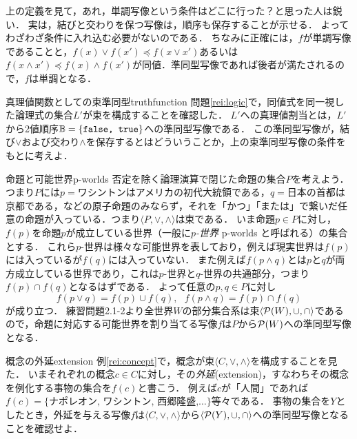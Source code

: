 \documentclass[11pt,a4paper, dvipdfmx]{jsarticle}
\begin{document}
\begin{attn}
上の定義を見て，あれ，単調写像という条件はどこに行った？と思った人は鋭い．
実は，結びと交わりを保つ写像は，順序も保存することが示せる．
よってわざわざ条件に入れ込む必要がないのである．
ちなみに正確には，$f$が単調写像であることと，$f(x) \vee f(x') \preceq f (x \vee x')$あるいは$f(x \wedge x') \preceq f(x) \wedge f(x')$が同値．準同型写像であれば後者が満たされるので，$f$は単調となる．
\end{attn}

\begin{rei}{真理値関数としての束準同型}{truthfunction}
問題\ref{rei:logic}で，同値式を同一視した論理式の集合$L'$が束を構成することを確認した．
$L'$への真理値割当とは，$L'$から2値順序$\mathbb{B} = \{ \texttt{false, true} \}$への準同型写像である．
この準同型写像が，結び$\vee$および交わり$\wedge$を保存するとはどういうことか，上の束準同型写像の条件をもとに考えよ．
\end{rei}

\begin{rei}{命題と可能世界}{p-worlds}
否定を除く論理演算で閉じた命題の集合$P$を考えよう．
つまり$P$には$p=$ワシントンはアメリカの初代大統領である，$q=$日本の首都は京都である，などの原子命題のみならず，それを「かつ」「または」で繋いだ任意の命題が入っている．つまり$\langle P, \vee, \wedge \rangle$は束である．
いま命題$p \in P$に対し，$f(p)$を命題$p$が成立している世界（一般に\emph{$p$-世界} p-worlds と呼ばれる）の集合とする．
これら$p$-世界は様々な可能世界を表しており，例えば現実世界は$f(p)$には入っているが$f(q)$には入っていない．
また例えば$f(p \wedge q)$とは$p$と$q$が両方成立している世界であり，これは$p$-世界と$q$-世界の共通部分，つまり$f(p) \cap f(q)$となるはずである．
よって任意の$p, q \in P$に対し
\[ f(p \vee q) = f(p) \cup f(q), \ \ \ f(p \wedge q) = f(p) \cap f(q) \]
が成り立つ．
練習問題2.1-2より全世界$W$の部分集合系は束$\langle \mathcal{P}(W), \cup, \cap \rangle$であるので，命題に対応する可能世界を割り当てる写像$f$は$P$から$\mathcal{P}(W)$への準同型写像となる．
\end{rei}

\begin{rei}{概念の外延}{extension}
例\ref{rei:concept}で，概念が束$\langle C, \vee, \wedge \rangle$を構成することを見た．
いまそれぞれの概念$c \in C$に対し，その\emph{外延}(extension)，すなわちその概念を例化する事物の集合を$f(c)$と書こう．
例えば$c$が「人間」であれば$f(c)=\{\text{ナポレオン, ワシントン, 西郷隆盛,}\dots\}$等々である．
事物の集合を$Y$としたとき，外延を与える写像$f$は$\langle C, \vee, \wedge \rangle$から$\langle \mathcal{P}(Y), \cup, \cap \rangle$への準同型写像となることを確認せよ．
\end{rei}
\end{document}
